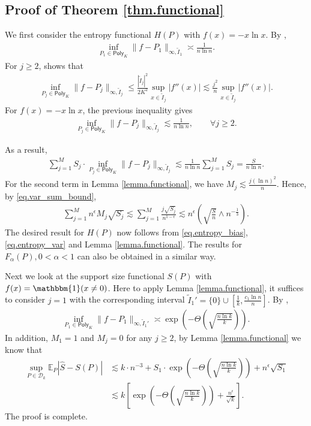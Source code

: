 \documentclass[final,12pt]{colt2018} %
\def \bE {\mathbb{E}}
\newcommand{\calD}{{\mathcal{D}}}
\begin{document}
\subsection{Proof of Theorem \ref{thm.functional}}
We first consider the entropy functional $H(P)$ with $f(x)=-x\ln x$. By \cite{Jiao--Venkat--Han--Weissman2015minimax}, 
\begin{align*}
\inf_{P_1\in\mathsf{Poly}_K}\|f-P_1\|_{\infty, \tilde{I}_1} \asymp \frac{1}{n\ln n}.
\end{align*}
For $j\ge 2$, \cite[Theorem 7.2.1]{Ditzian--Totik1987} shows that
\begin{align*}
\inf_{P_j\in \mathsf{Poly}_K}\|f-P_j\|_{\infty,\tilde{I}_j} \le \frac{|\tilde{I}_j|^2}{2K^2}\sup_{x\in\tilde{I}_j} |f''(x)| \lesssim \frac{j^2}{n}\sup_{x\in\tilde{I}_j} |f''(x)|.
\end{align*}
For $f(x)=-x\ln x$, the previous inequality gives
\begin{align*}
\inf_{P_j\in \mathsf{Poly}_K}\|f-P_j\|_{\infty,\tilde{I}_j} \lesssim \frac{1}{n\ln n}, \qquad \forall j\ge 2.
\end{align*}

As a result, 
\begin{align}\label{eq.entropy_bias}
\sum_{j=1}^M S_j\cdot \inf_{P_j\in \mathsf{Poly}_K}\|f-P_j\|_{\infty,\tilde{I}_j} \lesssim \frac{1}{n\ln n}\sum_{j=1}^M S_j = \frac{S}{n\ln n}.
\end{align}
For the second term in Lemma \ref{lemma.functional}, we have $M_j\lesssim \frac{j(\ln n)^2}{n}$. Hence, by \eqref{eq.var_sum_bound}, 
\begin{align}\label{eq.entropy_var}
\sum_{j=1}^M n^{\epsilon}M_j\sqrt{S_j} \lesssim \sum_{j=1}^M \frac{j\sqrt{S_j}}{n^{1-\epsilon}} \lesssim n^{\epsilon}\left(\sqrt{\frac{S}{n}}\wedge n^{-\frac{1}{3}}\right).
\end{align}
The desired result for $H(P)$ now follows from \eqref{eq.entropy_bias}, \eqref{eq.entropy_var} and Lemma \ref{lemma.functional}. The results for $F_\alpha(P), 0<\alpha<1$ can also be obtained in a similar way.

Next we look at the support size functional $S(P)$ with $f(x)=\mathbbm{1}(x\neq 0)$. Here to apply Lemma \ref{lemma.functional}, it suffices to consider $j=1$ with the corresponding interval $\tilde{I}_1'=\{0\}\cup[\frac{1}{k},\frac{c_1\ln n}{n}]$. By \cite{wu2015chebyshev}, 
\begin{align*}
\inf_{P_1\in\mathsf{Poly}_K}\|f-P_1\|_{\infty, \tilde{I}_1'} \asymp \exp\left(-\Theta\left(\sqrt{\frac{n\ln k}{k}}\right)\right).
\end{align*}
In addition, $M_1=1$ and $M_j=0$ for any $j\ge 2$, by Lemma \ref{lemma.functional} we know that
\begin{align*}
\sup_{P\in\calD_k} \bE_P |\hat{S}-S(P)| &\lesssim k\cdot n^{-3} + S_1\cdot \exp\left(-\Theta\left(\sqrt{\frac{n\ln k}{k}}\right)\right) + n^{\epsilon} \sqrt{S_1} \\
&\lesssim k\left[\exp\left(-\Theta\left(\sqrt{\frac{n\ln k}{k}}\right)\right) + \frac{n^{\epsilon}}{\sqrt{k}}\right].
\end{align*}
The proof is complete.
\end{document}
